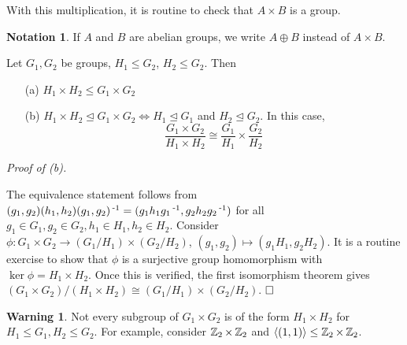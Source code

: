 \documentclass[11pt]{book}
\newcounter{counter}
\theoremstyle{definition}   \newtheorem{defn}[counter]{Definition} %
\newtheorem*{notation*}{Notation}   \newtheorem{example}[counter]{Example(s)}   \newtheorem*{example*}{Example(s)}   \newtheorem*{warning}{Warning} \newtheorem*{corollary*}{Corollary}
\newcommand{\nsg}{\mathrel{\unlhd}}   \newcommand{\ind}{\parindent24pt}   \newcommand{\vn}{\varnothing}
\newcommand{\gen}[1]{\langle #1 \rangle}   \newcommand{\stab}[2]{\tn{Stab}_{#1}(#2)}   \newcommand{\fix}[2]{\tn{Fix}_{#1}(#2)}
\DeclareMathOperator{\ra}{\rightarrow}   \DeclareMathOperator{\Poly}{\mathbf{P}}   \DeclareMathOperator{\spn}{\textnormal{span}}   \DeclareMathOperator{\aut}{\textnormal{Aut}}
\newcommand{\vs}{\vspace{8pt}}
\numberwithin{counter}{chapter}
\begin{document}
With this multiplication, it is routine to check that $A \times B$ is a group.

\vs

\begin{notation*}
If $A$ and $B$ are abelian groups, we write $A \oplus B$ instead of $A \times B$.
\end{notation*}

\vs

\begin{lemma}
Let $G_1,G_2$ be groups, $H_1 \leq G_2$, $H_2 \leq G_2$. Then
	\begin{enumerate}
	\item[(a)] $H_1 \times H_2 \leq G_1 \times G_2$
	\item[(b)] $H_1 \times H_2 \nsg G_1 \times G_2 \iff H_1 \nsg G_1$ and $H_2 \nsg G_2$. In this case,
		\[\frac{G_1 \times G_2}{H_1 \times H_2} \cong \frac{G_1}{H_1} \times \frac{G_2}{H_2} \]
	\end{enumerate}
\end{lemma}

\textit{Proof of (b).}

The equivalence statement follows from $(g_1,g_2)(h_1,h_2)(g_1,g_2)\operatorname{^{-1}} = (g_1h_1g_1\operatorname{^{-1}},g_2h_2g_2\operatorname{^{-1}})$ for all $g_1 \in G_1,g_2 \in G_2, h_1 \in H_1, h_2 \in H_2$. Consider $\phi : G_1 \times G_2 \ra (G_1/H_1) \times (G_2/H_2)$, $(g_1,g_2) \mapsto (g_1H_1,g_2H_2)$. It is a routine exercise to show that $\phi$ is a surjective group homomorphism with $\ker \phi = H_1 \times H_2$. Once this is verified, the first isomorphism theorem gives $(G_1\times G_2)/(H_1\times H_2) \cong (G_1/H_1)\times (G_2/H_2)$. $\hfill \square$

\vs

\begin{warning}
Not every subgroup of $G_1\times G_2$ is of the form $H_1 \times H_2$ for $H_1 \leq G_1, H_2 \leq G_2$. For example, consider $\operatorname{\mathbb{Z}}_2 \times \operatorname{\mathbb{Z}}_2$ and $\gen{(1,1)} \leq \z_2 \times \z_2$.
\end{warning}

\vs
\end{document}

